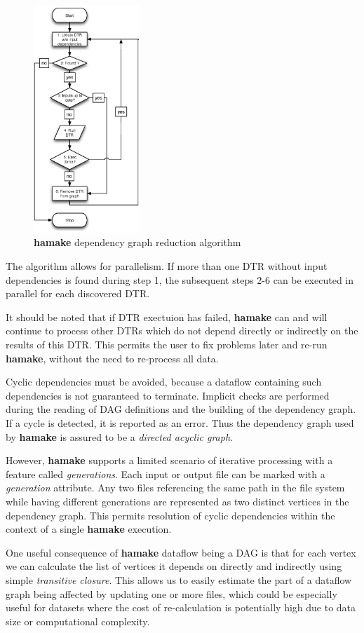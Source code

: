 \documentclass[10pt,conference,letterpaper]{IEEEtran}
\begin{document}
\begin{figure}[htp]
\centering
\includegraphics[width=4cm]{GraphReduction.eps}
\caption{\textbf{hamake} dependency graph reduction algorithm}
\label{fig:grred}
\end{figure}

The algorithm allows for parallelism. If more than one DTR without
input dependencies is found during step 1, the subsequent steps 2-6 can be executed in parallel for each discovered DTR.

It should be noted that if DTR exectuion has failed, \textbf{hamake} can and will continue to process other DTRs which do not depend directly or indirectly on the results of this DTR. This permits the user to fix problems later and re-run \textbf{hamake}, without the need to re-process all data.

Cyclic dependencies must be avoided, because a dataflow containing
such dependencies is not guaranteed to terminate. Implicit checks are performed during the reading of DAG definitions and the building of the dependency graph. If a cycle is detected, it is reported as an error. Thus the dependency graph used by \textbf{hamake} is assured to be a \textit{directed acyclic graph}.

However, \textbf{hamake} supports a limited scenario of iterative
processing with a feature called \textit{generations}. Each input or
output file can be marked with a \emph{generation}
attribute. Any two files referencing the same path in the file system while having different generations are represented as two distinct vertices in the dependency graph. This permits resolution of cyclic dependencies within the context of a single \textbf{hamake} execution.

One useful consequence of \textbf{hamake} dataflow being a DAG is
that for each vertex we can calculate the list of vertices it depends on directly and indirectly using simple \textit{transitive closure}. This allows us to easily estimate the part of a dataflow graph being affected by updating one or more files, which could be especially useful for datasets where the cost of re-calculation is potentially high due to data size or computational complexity. 
\end{document}
